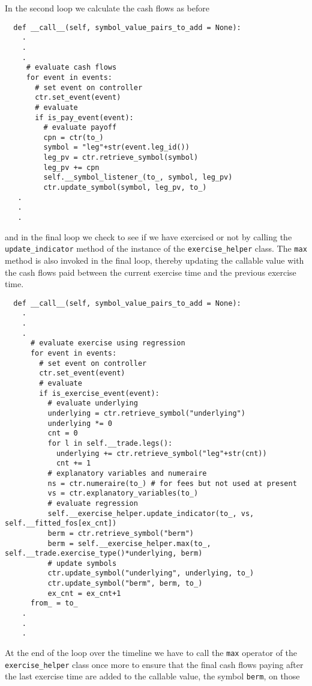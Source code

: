 In the second loop we calculate the cash flows as
before
\begin{verbatim}      
  def __call__(self, symbol_value_pairs_to_add = None):
    .
    .
    .
     # evaluate cash flows
     for event in events:
       # set event on controller
       ctr.set_event(event)
       # evaluate
       if is_pay_event(event):
         # evaluate payoff
         cpn = ctr(to_)
         symbol = "leg"+str(event.leg_id())
         leg_pv = ctr.retrieve_symbol(symbol) 
         leg_pv += cpn        
         self.__symbol_listener_(to_, symbol, leg_pv)
         ctr.update_symbol(symbol, leg_pv, to_)                   
   .
   .
   .
\end{verbatim}
and in the final loop we check to see if we have exercised or
not by calling the \verb|update_indicator| method of the instance of
the \verb|exercise_helper| class. The \verb|max| method is also
invoked in the final loop, thereby updating the callable value with the
cash flows paid between the current exercise time and the previous
exercise time. 
\begin{verbatim}      
  def __call__(self, symbol_value_pairs_to_add = None):
    .
    .
    .
      # evaluate exercise using regression   
      for event in events:
        # set event on controller
        ctr.set_event(event)
        # evaluate
        if is_exercise_event(event):
          # evaluate underlying             
          underlying = ctr.retrieve_symbol("underlying")
          underlying *= 0
          cnt = 0
          for l in self.__trade.legs():
            underlying += ctr.retrieve_symbol("leg"+str(cnt))         
            cnt += 1
          # explanatory variables and numeraire
          ns = ctr.numeraire(to_) # for fees but not used at present
          vs = ctr.explanatory_variables(to_)
          # evaluate regression
          self.__exercise_helper.update_indicator(to_, vs, self.__fitted_fos[ex_cnt])
          berm = ctr.retrieve_symbol("berm")
          berm = self.__exercise_helper.max(to_, self.__trade.exercise_type()*underlying, berm)
          # update symbols
          ctr.update_symbol("underlying", underlying, to_)
          ctr.update_symbol("berm", berm, to_)
          ex_cnt = ex_cnt+1
      from_ = to_
    .
    .
    .
\end{verbatim}
At the end of the loop over the timeline we have to call the
\verb|max| operator of the \verb|exercise_helper| class once more to
ensure that the final cash flows paying after the last exercise time
are added to the callable value, the symbol \verb|berm|, on those
